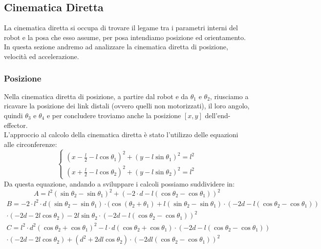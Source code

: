 \subsection{Cinematica Diretta}
La cinematica diretta si occupa di trovare il legame tra i parametri interni del robot e la posa che esso assume, per posa intendiamo posizione ed orientamento. In questa sezione andremo ad analizzare la cinematica diretta di posizione, velocità ed accelerazione.
\subsubsection{Posizione}\label{sec:Cinematica-pos}
Nella cinematica diretta di posizione, a partire dal robot e da $\theta_1$ e $\theta_2$, riusciamo a ricavare la posizione dei link distali (ovvero quelli non motorizzati), il loro angolo, quindi $\theta_3$ e $\theta_4$ e per concludere troviamo anche la posizione $[x,y]$ dell'end-effector.
\\L'approccio al calcolo della cinematica diretta è stato l'utilizzo delle equazioni alle circonferenze:
\begin{equation}
    \begin{cases}
    (x-\frac{l}{2}-l\cos\theta_1)^2+(y-l\sin\theta_1)^2 = l^2 \\
    (x+\frac{l}{2}-l\cos\theta_2)^2+(y-l\sin\theta_2)^2 = l^2
    \end{cases}
\end{equation}
Da questa equazione, andando a sviluppare i calcoli possiamo suddividere in:
\begin{equation*}
    A = l^2 (\sin\theta_2- \sin\theta_1)^2 + (-2\cdot d-l (\cos\theta_2 - \cos\theta_1))^2
\end{equation*}
\begin{equation*}
\begin{aligned}
   B =  -2\cdot l^2 \cdot d (\sin\theta_2-\sin\theta_1)\cdot  (\cos(\theta_2+\theta_1) + l(\sin\theta_2-\sin\theta_1)\cdot   (-2d-l(\cos\theta_2-\cos\theta_1))\\\cdot (-2d-2l\cos\theta_2) - 2l\sin\theta_2\cdot (-2d-l(\cos\theta_2-\cos\theta_1))^2
\end{aligned}
\end{equation*}
\begin{equation*}
\begin{aligned}
    C = l^2\cdot d^2 (\cos\theta_2+\cos\theta_1)^2-l\cdot d (\cos\theta_2+\cos\theta_1)\cdot(-2d-l(\cos\theta_2-\cos\theta_1) ) \\\cdot (-2d-2l\cos\theta_2)+(d^2+2dl\cos\theta_2)\cdot(-2dl(\cos\theta_2-\cos\theta_1))^2
\end{aligned}
\end{equation*}

